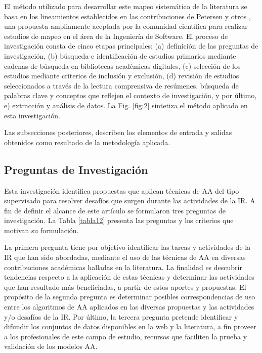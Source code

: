 \documentclass[journal]{IEEEtran}
\begin{document}
El método utilizado para desarrollar este mapeo sistemático de la literatura se basa en los lineamientos establecidos en las contribuciones de Petersen y otros \cite{petersen2008systematic}, una propuesta ampliamente aceptada por la comunidad científica para realizar estudios de mapeo en el área de la Ingeniería de Software. El proceso de investigación consta de cinco etapas principales: (a) definición de las preguntas de investigación, (b) búsqueda e identificación de estudios primarios mediante cadenas de búsqueda en bibliotecas académicas digitales, (c) selección de los estudios mediante criterios de inclusión y exclusión, (d) revisión de estudios seleccionados a través de la lectura comprensiva de resúmenes, búsqueda de palabras clave y conceptos que reflejen el contexto de investigación, y por último, e) extracción y análisis de datos. La Fig. \ref{fig:2} sintetiza el método aplicado en esta investigación.

Las subsecciones posteriores, describen los elementos de entrada y salidas obtenidos como resultado de la metodología aplicada.

\subsection{Preguntas de Investigación}

Esta investigación identifica propuestas que aplican técnicas de AA del tipo supervisado para resolver desafíos que surgen durante las actividades de la IR. A fin de definir el alcance de este artículo se formularon tres preguntas de investigación. La Tabla \ref{tabla12} presenta las preguntas y los criterios que motivan su formulación. 

La primera pregunta tiene por objetivo identificar las tareas y  actividades de la IR que han sido abordadas, mediante el uso de las técnicas de AA  en diversas contribuciones académicas halladas en la literatura. La finalidad es descubrir tendencias respecto a la aplicación de estas técnicas  y determinar las actividades que han resultado más beneficiadas, a partir de estos aportes y propuestas. El propósito de la segunda pregunta es determinar posibles correspondencias de uso entre los algoritmos de AA aplicados en las diversas propuestas y las actividades y/o desafíos de la IR. Por último, la tercera pregunta pretende identificar y difundir los conjuntos de datos disponibles en la web y la literatura, a fin proveer a los profesionales de este campo de estudio, recursos que faciliten la prueba y validación de los modelos AA. 
\end{document}
